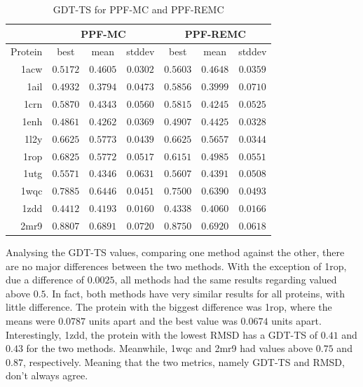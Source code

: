 \begin{table}
  \centering
  \begin{tabular}{r|c|c|c||c|c|c}
            & \multicolumn{3}{c}{PPF-MC} & \multicolumn{3}{||c}{PPF-REMC} \\ \hline
    Protein & best          & mean          & stddev   & best          & mean          & stddev   \\ \hline \hline
    1acw    & $\bm{0.5172}$ & $0.4605$      & $0.0302$ & $\bm{0.5603}$ & $0.4648$      & $0.0359$ \\ \hline
    1ail    & $0.4932$      & $0.3794$      & $0.0473$ & $\bm{0.5856}$ & $0.3999$      & $0.0710$ \\ \hline
    1crn    & $\bm{0.5870}$ & $0.4343$      & $0.0560$ & $\bm{0.5815}$ & $0.4245$      & $0.0525$ \\ \hline
    1enh    & $0.4861$      & $0.4262$      & $0.0369$ & $0.4907$      & $0.4425$      & $0.0328$ \\ \hline
    1l2y    & $\bm{0.6625}$ & $\bm{0.5773}$ & $0.0439$ & $\bm{0.6625}$ & $\bm{0.5657}$ & $0.0344$ \\ \hline
    1rop    & $\bm{0.6825}$ & $\bm{0.5772}$ & $0.0517$ & $\bm{0.6151}$ & $0.4985$      & $0.0551$ \\ \hline
    1utg    & $\bm{0.5571}$ & $0.4346$      & $0.0631$ & $\bm{0.5607}$ & $0.4391$      & $0.0508$ \\ \hline
    1wqc    & $\bm{0.7885}$ & $\bm{0.6446}$ & $0.0451$ & $\bm{0.7500}$ & $\bm{0.6390}$ & $0.0493$ \\ \hline
    1zdd    & $0.4412$      & $0.4193$      & $0.0160$ & $0.4338$      & $0.4060$      & $0.0166$ \\ \hline
    2mr9    & $\bm{0.8807}$ & $\bm{0.6891}$ & $0.0720$ & $\bm{0.8750}$ & $\bm{0.6920}$ & $0.0618$ \\ \hline
  \end{tabular}
  \caption{GDT-TS for PPF-MC and PPF-REMC}
  \label{tab:gdtts-data}
\end{table}

Analysing the GDT-TS values, comparing one method against the other, there are no
major differences between the two methods.
With the exception of 1rop, due a difference of $0.0025$, all
methods had the same results regarding valued above $0.5$. In fact, both methods
have very similar results for all proteins, with little difference. The protein
with the biggest difference was 1rop, where the means were $0.0787$ units apart
and the best value was $0.0674$ units apart. Interestingly, 1zdd, the protein
with the lowest RMSD has a GDT-TS of $0.41$ and $0.43$ for the two methods.
Meanwhile, 1wqc and 2mr9 had values above $0.75$ and $0.87$, respectively.
Meaning that the two metrics, namely GDT-TS and RMSD, don't always agree.

